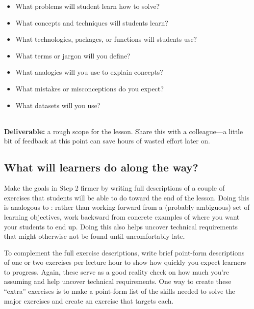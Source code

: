 \begin{itemize}

\item
  What problems will student learn how to solve?

\item
  What concepts and techniques will students learn?

\item
  What technologies, packages, or functions will students use?

\item
  What terms or jargon will you define?

\item
  What analogies will you use to explain concepts?

\item
  What mistakes or misconceptions do you expect?

\item
  What datasets will you use?

\end{itemize}

~\\
\noindent
\textbf{Deliverable:}
a rough scope for the lesson.
Share this with a colleague---a little bit of feedback at this point
can save hours of wasted effort later on.

\subsection*{What will learners do along the way?}

Make the goals in Step 2 firmer by writing full descriptions of
a couple of exercises that students will be able to do toward the end of the lesson.
Doing this is analogous to :
rather than working forward from a (probably ambiguous) set of learning objectives,
work backward from concrete examples of where you want your students to end up.
Doing this also helps uncover technical requirements
that might otherwise not be found until uncomfortably late.

To complement the full exercise descriptions,
write brief point-form descriptions of one or two exercises per lecture hour
to show how quickly you expect learners to progress.
Again,
these serve as a good reality check on how much you're assuming
and help uncover technical requirements.
One way to create these ``extra'' exercises
is to make a point-form list of the skills needed to solve the major exercises
and create an exercise that targets each.

